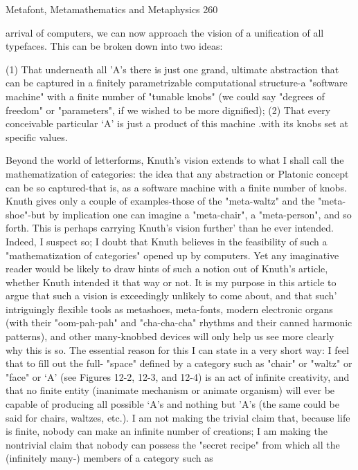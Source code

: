 Metafont, Metamathematics and Metaphysics                                                260

arrival of computers, we can now approach the vision of a unification of all typefaces.
This can be broken down into two ideas:

   (1) That underneath all 'A's there is just one grand, ultimate abstraction that can be
       captured in a finitely parametrizable computational structure-a "software
       machine" with a finite number of "tunable knobs" (we could say "degrees of
       freedom" or "parameters", if we wished to be more dignified);
   (2) That every conceivable particular `A' is just a product of this machine .with its
       knobs set at specific values.

    Beyond the world of letterforms, Knuth's vision extends to what I shall call the
mathematization of categories: the idea that any abstraction or Platonic concept can be so
captured-that is, as a software machine with a finite number of knobs. Knuth gives only a
couple of examples-those of the "meta-waltz" and the "meta-shoe"-but by implication one
can imagine a "meta-chair", a "meta-person", and so forth.
    This is perhaps carrying Knuth's vision further' than he ever intended. Indeed, I
suspect so; I doubt that Knuth believes in the feasibility of such a "mathematization of
categories" opened up by computers. Yet any imaginative reader would be likely to draw
hints of such a notion out of Knuth's article, whether Knuth intended it that way or not. It
is my purpose in this article to argue that such a vision is exceedingly unlikely to come
about, and that such' intriguingly flexible tools as metashoes, meta-fonts, modern
electronic organs (with their "oom-pah-pah" and "cha-cha-cha" rhythms and their canned
harmonic patterns), and other many-knobbed devices will only help us see more clearly
why this is so. The essential reason for this I can state in a very short way: I feel that to
fill out the full- "space" defined by a category such as "chair" or "waltz" or "face" or `A'
(see Figures 12-2, 12-3, and 12-4) is an act of infinite creativity, and that no finite entity
(inanimate mechanism or animate organism) will ever be capable of producing all
possible `A's and nothing but 'A's (the same could be said for chairs, waltzes, etc.).
    I am not making the trivial claim that, because life is finite, nobody can make an
infinite number of creations; I am making the nontrivial claim that nobody can possess
the "secret recipe" from which all the (infinitely many-) members of a category such as
